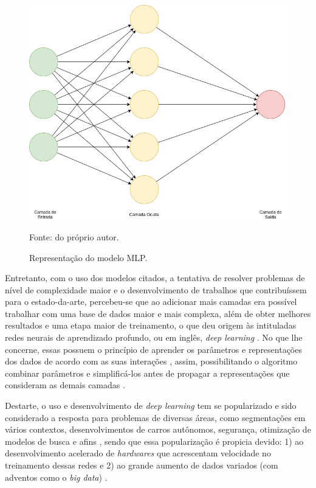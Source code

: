 \begin{figure}[H]
    \centering
    \caption{Representação do modelo MLP.}
    \includegraphics[width=1\linewidth]{recursos/imagens/deep/mlp.png}
    \label{deep:fig:4}

    \vspace*{1 cm}
    Fonte: do próprio autor.
\end{figure}

Entretanto, com o uso dos modelos citados, a tentativa de resolver problemas de nível de complexidade maior e o desenvolvimento de trabalhos que contribuíssem para o estado-da-arte, percebeu-se que ao adicionar mais camadas era possível trabalhar com uma base de dados maior e mais complexa, além de obter melhores resultados e uma etapa maior de treinamento, o que deu origem às intituladas redes neurais de aprendizado profundo, ou em inglês, \textit{deep learning} \cite{Goodfellow2016}. No que lhe concerne, essas possuem o princípio de aprender os parâmetros e representações dos dados de acordo com as suas interações \cite{ponti2018funciona}, assim, possibilitando o algoritmo combinar parâmetros e simplificá-los antes de propagar a representações que consideram as demais camadas \cite{Goodfellow2016}.

Destarte, o uso e desenvolvimento de \textit{deep learning} tem se popularizado e sido considerado a resposta para problemas de diversas áreas, como segmentações em vários contextos, desenvolvimentos de carros autônomos, segurança, otimização de modelos de busca e afins \cite{Ghosh2019}, sendo que essa popularização é propicia devido: 1) ao desenvolvimento acelerado de \textit{hardwares} que acrescentam velocidade no treinamento dessas redes e 2) ao grande aumento de dados variados (com adventos como o \textit{big data}) \cite{Szegedy2015, ponti2018funciona}.

